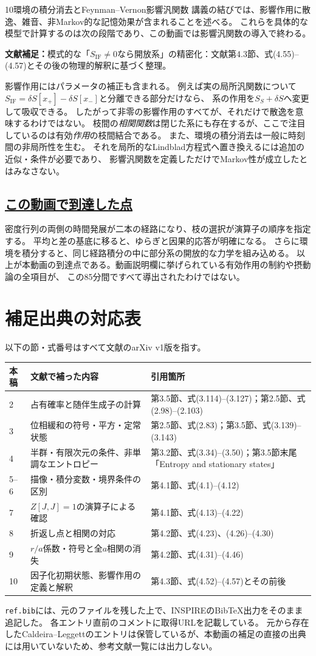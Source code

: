 \documentclass[a4paper,11pt]{ltjsarticle}
\newcommand{\subsectionlink}[1]{\subsection[#1]{\hyperlink{toc}{#1}}}
\numberwithin{equation}{section}
\newcommand{\IF}{\mathrm{IF}}
\newcommand{\supplement}[1]{\par\medskip\noindent\textcolor{notered}{\textbf{文献補足：}}#1\par\smallskip}
\begin{document}
\begin{lecturesection}{10}{環境の積分消去とFeynman--Vernon影響汎関数}
講義の結びでは、影響作用に散逸、雑音、非Markov的な記憶効果が含まれることを述べる。
これらを具体的な模型で計算するのは次の段階であり、この動画では影響汎関数の導入で終わる。

\supplement{模式的な「$S_{\IF}\ne0$なら開放系」の精密化：文献\cite{Pajer:2026fuo}第4.3節、式(4.55)--(4.57)とその後の物理的解釈に基づく整理。}
影響作用にはパラメータの補正も含まれる。
例えば実の局所汎関数について$S_{\IF}=\delta S[x_+]-\delta S[x_-]$と分離できる部分だけなら、
系の作用を$S_S+\delta S$へ変更して吸収できる。
したがって非零の影響作用のすべてが、それだけで散逸を意味するわけではない。
枝間の\emph{相関関数}は閉じた系にも存在するが、ここで注目しているのは有効\emph{作用}の枝間結合である。
また、環境の積分消去は一般に時刻間の非局所性を生む。
それを局所的なLindblad方程式へ置き換えるには追加の近似・条件が必要であり、
影響汎関数を定義しただけでMarkov性が成立したとはみなさない。

\subsectionlink{この動画で到達した点}
密度行列の両側の時間発展が二本の経路になり、枝の選択が演算子の順序を指定する。
平均と差の基底に移ると、ゆらぎと因果的応答が明確になる。
さらに環境を積分すると、同じ経路積分の中に部分系の開放的な力学を組み込める。
以上が本動画の到達点である。動画説明欄に挙げられている有効作用の制約や摂動論の全項目が、
この85分間ですべて導出されたわけではない。
\end{lecturesection}

\section*{補足出典の対応表}
以下の節・式番号はすべて文献\cite{Pajer:2026fuo}のarXiv v1版を指す。
\begin{longtable}{@{}p{}p{}p{}@{}}
\toprule 本稿 & 文献で補った内容 & 引用箇所\\\midrule\endhead
2 & 占有確率と随伴生成子の計算 & 第3.5節、式(3.114)--(3.127)；第2.5節、式(2.98)--(2.103)\\
3 & 位相緩和の符号・平方・定常状態 & 第2.5節、式(2.83)；第3.5節、式(3.139)--(3.143)\\
4 & 半群・有限次元の条件、非単調なエントロピー & 第3.2節、式(3.34)--(3.50)；第3.5節末尾「Entropy and stationary states」\\
5--6 & 描像・積分変数・境界条件の区別 & 第4.1節、式(4.1)--(4.12)\\
7 & $Z[J,J]=1$の演算子による確認 & 第4.1節、式(4.13)--(4.22)\\
8 & 折返し点と相関の対応 & 第4.2節、式(4.23)、(4.26)--(4.30)\\
9 & $r/a$係数・符号と全$a$相関の消失 & 第4.2節、式(4.31)--(4.46)\\
10 & 因子化初期状態、影響作用の定義と解釈 & 第4.3節、式(4.52)--(4.57)とその前後\\\bottomrule
\end{longtable}
\noindent\texttt{ref.bib}には、元のファイルを残した上で、INSPIREのBibTeX出力をそのまま追記した。
各エントリ直前のコメントに取得URLを記載している。
元から存在したCaldeira--Leggettのエントリは保管しているが、本動画の補足の直接の出典には用いていないため、参考文献一覧には出力しない。
\clearpage


\end{document}
